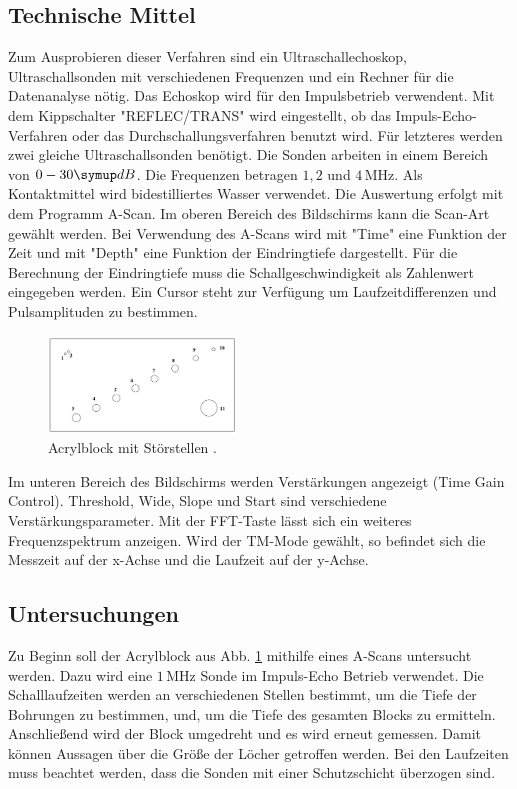 \subsection{Technische Mittel}
Zum Ausprobieren dieser Verfahren sind ein Ultraschallechoskop, Ultraschallsonden
mit verschiedenen Frequenzen und ein Rechner für die Datenanalyse nötig. Das
Echoskop wird für den Impulsbetrieb verwendent. Mit dem Kippschalter
"REFLEC/TRANS" wird eingestellt, ob das Impuls-Echo-Verfahren oder das
Durchschallungsverfahren benutzt wird. Für letzteres werden zwei gleiche
Ultraschallsonden benötigt. Die Sonden arbeiten in einem Bereich von $0-30 \su{dB}$.
Die Frequenzen betragen $1,2$ und $4 \,\si{\mega\hertz}$. Als Kontaktmittel
wird bidestilliertes Wasser verwendet. Die Auswertung erfolgt mit dem
Programm A-Scan. Im oberen Bereich des Bildschirms kann die Scan-Art gewählt werden.
Bei Verwendung des A-Scans wird mit "Time" eine Funktion der Zeit und mit "Depth"
eine Funktion der Eindringtiefe dargestellt. Für die Berechnung der Eindringtiefe
muss die Schallgeschwindigkeit als Zahlenwert eingegeben werden. Ein Cursor
steht zur Verfügung um Laufzeitdifferenzen und Pulsamplituden zu bestimmen.
\begin{figure}
  \centering
  \includegraphics[width=5cm]{bilder/block.png}
  \caption{Acrylblock mit Störstellen \cite{us2}.}
  \label{fig:block}
\end{figure}
Im unteren Bereich des Bildschirms werden Verstärkungen angezeigt (Time Gain
Control). Threshold, Wide, Slope und Start sind verschiedene Verstärkungsparameter.
Mit der FFT-Taste lässt sich ein weiteres Frequenzspektrum anzeigen.
Wird der TM-Mode gewählt, so befindet sich die Messzeit auf der x-Achse und
die Laufzeit auf der y-Achse.

\subsection{Untersuchungen}
Zu Beginn soll der Acrylblock aus Abb. \ref{fig:block} mithilfe eines A-Scans untersucht werden.
Dazu wird
eine $1 \,\si{\mega\hertz}$ Sonde im Impuls-Echo Betrieb verwendet. Die Schalllaufzeiten
werden an verschiedenen Stellen bestimmt, um die Tiefe der Bohrungen zu bestimmen,
und, um die Tiefe des gesamten Blocks zu ermitteln.
Anschließend wird der Block umgedreht und es wird erneut gemessen. Damit können
Aussagen über die Größe der Löcher getroffen werden. Bei den Laufzeiten muss beachtet werden,
dass die Sonden mit einer Schutzschicht überzogen sind.

